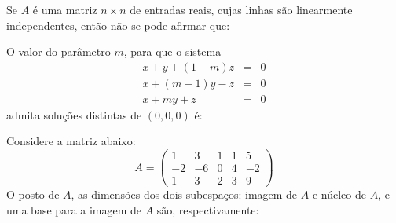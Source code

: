 \documentclass[10pt,a4paper]{article}
\begin{document}
%
{
\def\AMCbeginQuestion#1#2{\par\noindent{\bf (POSCOMP 2004 - Questão 07)}}
\begin{question}{} Se $A$ é uma matriz $n\times n$ de entradas reais, cujas linhas são linearmente independentes, então não se pode afirmar que:
\begin{choices}
\end{choices}
\end{question}
}
%
{
\def\AMCbeginQuestion#1#2{\par\noindent{\bf (POSCOMP 2004 - Questão 18)}}
\begin{question}{} O valor do parâmetro $m$, para que o sistema
\[
\begin{array}{rcl}
x+y+(1-m)z&=&0\\
x+(m-1)y-z&=&0\\
x+my+z&=&0
\end{array}
\]
admita soluções distintas de $(0,0,0)$ é:
\begin{choices}
\end{choices}
\end{question}
}
%
{
\def\AMCbeginQuestion#1#2{\par\noindent{\bf (POSCOMP 2005 - Questão 03)}}
\begin{question}{} Considere a matriz abaixo:
\[
A=\left(\begin{array}{rrrrr}
1&3&1&1&5\\
-2&-6&0&4&-2\\
1&3&2&3&9
\end{array}\right)
\]
O posto de $A$, as dimensões dos dois subespaços: imagem de $A$ e núcleo de $A$, e uma base para a imagem de $A$ são, respectivamente:
\begin{choices}
\end{choices}
\end{question}
}
%
\end{document}
